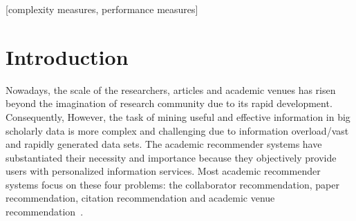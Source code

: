 \documentclass[9pt]{acm_proc_article-sp}
\begin{document}
\maketitle
\begin{abstract}
Academic venues act as the main platforms of academic communities and the bridge of connecting researchers, which have rapidly developed in recent years. However, information overload (massive data sets) in big scholarly data creates a tremendous challenges for mining useful and effective information in order to recommend researchers to keep concerns on high quality and fruitful academic venues, and to participate in relevant academic conferences and contribute to influential journals. In this work, we propose AVER, a novel random walk based academic venue recommendation model. AVER builds the co-publication network with two kinds of associations, i.e. co-author relations and author-venue relations. We exploit three academic factors to define a transfer matrix with bias which drives a random walk with restart model running on the co-publication network. The three academic factors, i.e. co-publication frequency, weight of relations and similar-level preferred, are inspired by the fact that, researchers are more likely to contact with those who have high co-publication frequency and similar academic level with them, as well as the weight of the two kinds of associations should be differentiated. We conduct extensive experiments on DBLP data set in order to measure AVER. The results demonstrate that AVER significantly improves the performance on precision, recall and F1 when compared to the baseline approaches.
\end{abstract}

[complexity measures, performance measures]



\section{Introduction}
Nowadays, the scale of the researchers, articles and academic venues has risen beyond the imagination of research community due to its rapid development. Consequently, However, the task of mining useful and effective information in big scholarly data is more complex and challenging due to information overload/vast and rapidly generated data sets. The academic recommender systems have substantiated their necessity and importance because they objectively provide users with personalized information services. Most academic recommender systems focus on these four problems: the collaborator recommendation, paper recommendation, citation recommendation and academic venue recommendation~\cite{yang2014recommendation}.
\end{document}
